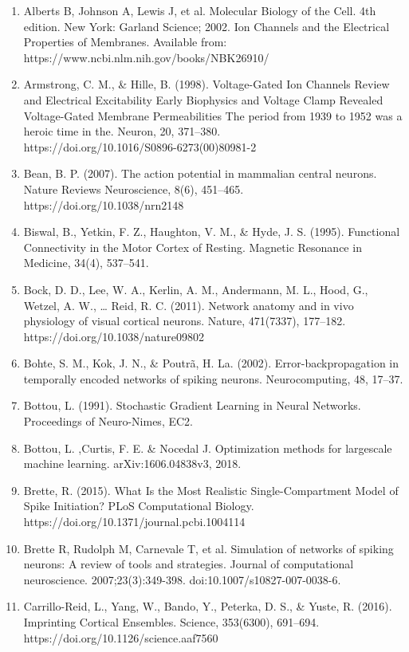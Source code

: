 \documentclass[11pt]{article}
\begin{document}
\begin{enumerate}
\item Alberts B, Johnson A, Lewis J, et al. Molecular Biology of the Cell. 4th edition. New York: Garland Science; 2002. Ion Channels and the Electrical Properties of Membranes. Available from: https://www.ncbi.nlm.nih.gov/books/NBK26910/
\item Armstrong, C. M., \& Hille, B. (1998). Voltage-Gated Ion Channels Review and Electrical Excitability Early Biophysics and Voltage Clamp Revealed Voltage-Gated Membrane Permeabilities The period from 1939 to 1952 was a heroic time in the. Neuron, 20, 371–380.\\ https://doi.org/10.1016/S0896-6273(00)80981-2
\item Bean, B. P. (2007). The action potential in mammalian central neurons. Nature Reviews Neuroscience, 8(6), 451–465. https://doi.org/10.1038/nrn2148
\item Biswal, B., Yetkin, F. Z., Haughton, V. M., \& Hyde, J. S. (1995). Functional Connectivity in the Motor Cortex of Resting. Magnetic Resonance in Medicine, 34(4), 537–541.
\item Bock, D. D., Lee, W. A., Kerlin, A. M., Andermann, M. L., Hood, G., Wetzel, A. W., … Reid, R. C. (2011). Network anatomy and in vivo physiology of visual cortical neurons. Nature, 471(7337), 177–182. https://doi.org/10.1038/nature09802
\item Bohte, S. M., Kok, J. N., \& Poutrã, H. La. (2002). Error-backpropagation in temporally encoded networks of spiking neurons. Neurocomputing, 48, 17–37.
\item Bottou, L. (1991). Stochastic Gradient Learning in Neural Networks. Proceedings of Neuro-Nimes, EC2.
\item Bottou, L. ,Curtis, F. E. \& Nocedal J. Optimization methods for largescale
machine learning. arXiv:1606.04838v3, 2018.
\item Brette, R. (2015). What Is the Most Realistic Single-Compartment Model of Spike Initiation? PLoS Computational Biology. https://doi.org/10.1371/journal.pcbi.1004114
\item Brette R, Rudolph M, Carnevale T, et al. Simulation of networks of spiking neurons: A review of tools and strategies. Journal of computational neuroscience. 2007;23(3):349-398. doi:10.1007/s10827-007-0038-6.
\item Carrillo-Reid, L., Yang, W., Bando, Y., Peterka, D. S., \& Yuste, R. (2016). Imprinting Cortical Ensembles. Science, 353(6300), 691–694. https://doi.org/10.1126/science.aaf7560

\end{enumerate}
\end{document}
